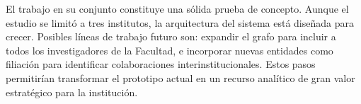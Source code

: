 \documentclass[journal]{IEEEtran}
\begin{document}
El trabajo en su conjunto constituye una sólida prueba de concepto. Aunque el estudio se limitó a tres institutos, la arquitectura del sistema está diseñada para crecer. Posibles líneas de trabajo futuro son: expandir el grafo para incluir a todos los investigadores de la Facultad, e incorporar nuevas entidades como filiación para identificar colaboraciones interinstitucionales. Estos pasos permitirían transformar el prototipo actual en un recurso analítico de gran valor estratégico para la institución.

%


\end{document}
